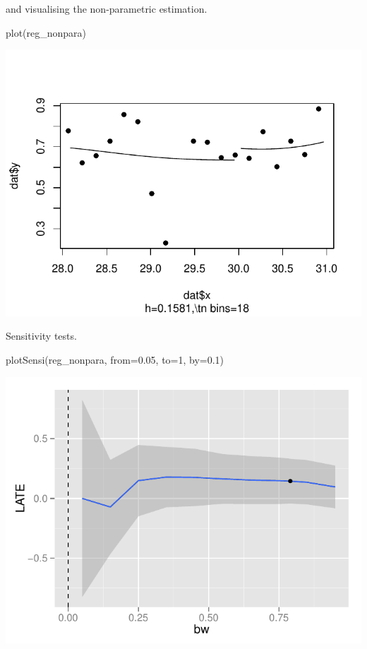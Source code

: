 \documentclass[article]{jss}
\begin{document}
and visualising the non-parametric estimation.

\begin{CodeChunk}
\begin{CodeInput}
plot(reg_nonpara)
\end{CodeInput}


\begin{center}\includegraphics{README_files/figure-latex/plot-reg_nonpara-1} \end{center}

\end{CodeChunk}

Sensitivity tests.

\begin{CodeChunk}
\begin{CodeInput}
plotSensi(reg_nonpara, from=0.05, to=1, by=0.1)
\end{CodeInput}


\begin{center}\includegraphics{README_files/figure-latex/sensi-1} \end{center}

\end{CodeChunk}
\end{document}
